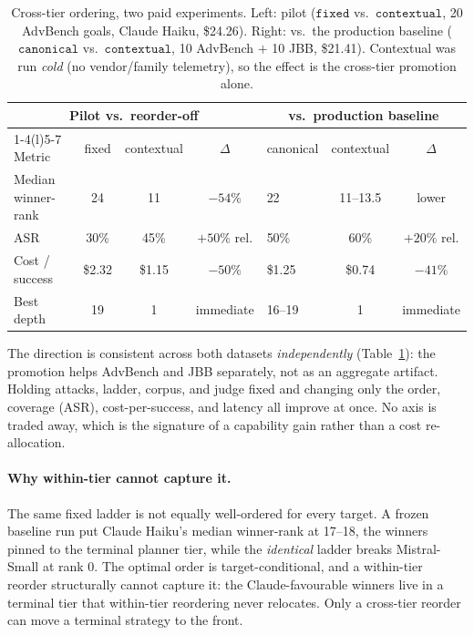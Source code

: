 \documentclass[letterpaper,twocolumn,10pt]{article}
\begin{document}
\begin{table}[t]
\centering
\small
\caption{Cross-tier ordering, two paid experiments. Left: pilot ($\texttt{fixed}$ vs.\ $\texttt{contextual}$, 20 AdvBench goals, Claude Haiku, \$24.26). Right: vs.\ the production baseline ($\texttt{canonical}$ vs.\ $\texttt{contextual}$, 10 AdvBench $+$ 10 JBB, \$21.41). Contextual was run \emph{cold} (no vendor/family telemetry), so the effect is the cross-tier promotion alone.}
\label{tab:crosstier}
\begin{tabular}{lccclcc}
\toprule
\multicolumn{4}{c}{Pilot vs.\ reorder-off} & \multicolumn{3}{c}{vs.\ production baseline} \\
\cmidrule(r){1-4}\cmidrule(l){5-7}
Metric & fixed & contextual & $\Delta$ & canonical & contextual & $\Delta$ \\
\midrule
Median winner-rank & 24 & 11 & $-54\%$ & 22 & 11--13.5 & lower \\
ASR & 30\% & 45\% & $+50\%$ rel. & 50\% & 60\% & $+20\%$ rel. \\
Cost / success & \$2.32 & \$1.15 & $-50\%$ & \$1.25 & \$0.74 & $-41\%$ \\
Best depth & 19 & 1 & immediate & 16--19 & 1 & immediate \\
\bottomrule
\end{tabular}
\end{table}

The direction is consistent across both datasets \emph{independently} (Table~\ref{tab:crosstier}): the promotion helps AdvBench and JBB separately, not as an aggregate artifact. Holding attacks, ladder, corpus, and judge fixed and changing only the order, coverage (ASR), cost-per-success, and latency all improve at once. No axis is traded away, which is the signature of a capability gain rather than a cost re-allocation.

\paragraph{Why within-tier cannot capture it.} The same fixed ladder is not equally well-ordered for every target. A frozen baseline run put Claude Haiku's median winner-rank at 17--18, the winners pinned to the terminal planner tier, while the \emph{identical} ladder breaks Mistral-Small at rank 0. The optimal order is target-conditional, and a within-tier reorder structurally cannot capture it: the Claude-favourable winners live in a terminal tier that within-tier reordering never relocates. Only a cross-tier reorder can move a terminal strategy to the front.
\end{document}
